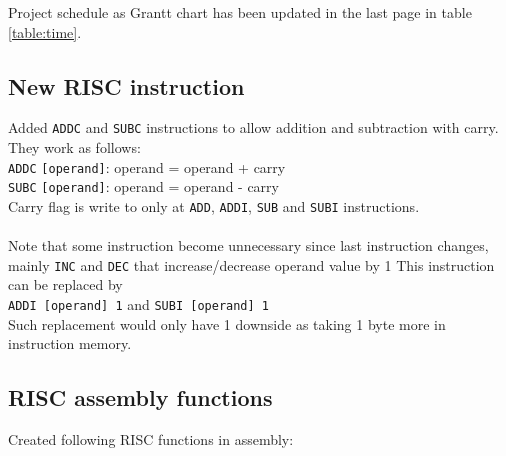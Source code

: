 \documentclass[a4paper,11pt]{article}
\begin{document}
Project schedule as Grantt chart has been updated in the last page in table \ref{table:time}. 

\subsection{New RISC instruction}
Added \texttt{ADDC} and \texttt{SUBC} instructions to allow addition and subtraction with carry. They work as follows:
\\
\texttt{ADDC} \texttt{[operand]}: operand = operand + carry\\ 
\texttt{SUBC} \texttt{[operand]}: operand = operand - carry \\
Carry flag is write to only at \texttt{ADD}, \texttt{ADDI}, \texttt{SUB} and \texttt{SUBI} instructions. 
\\\\
Note that some instruction become unnecessary since last instruction changes, mainly \texttt{INC} and \texttt{DEC} that increase/decrease operand value by 1 This instruction can be replaced by \\\texttt{ADDI [operand] 1} and \texttt{SUBI [operand] 1}\\
Such replacement would only have 1 downside as taking 1 byte more in instruction memory.
\subsection{RISC assembly functions}
Created following RISC functions in assembly:
\end{document}
